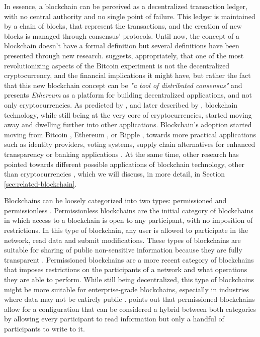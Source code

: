 In essence, a blockchain can be perceived as a decentralized transaction ledger, with no central authority and no single point of failure. This ledger is maintained by a chain of blocks, that represent the transactions, and the creation of new blocks is managed through consensus' protocols. Until now, the concept of a blockchain doesn't have a formal definition but several definitions have been presented through new research. \citeauthor{buterin_next-generation_2013} \cite{buterin_next-generation_2013} suggests, appropriately, that one of the most revolutionizing aspects of the Bitcoin experiment is not the decentralized cryptocurrency, and the financial implications it might have, but rather the fact that this new blockchain concept can be \textit{"a tool of distributed consensus"} \cite{buterin_next-generation_2013} and presents \textit{Ethereum} as a platform for building decentralized applications, and not only cryptocurrencies. As predicted by \citeauthor{buterin_next-generation_2013} \cite{buterin_next-generation_2013}, and later described by \citeauthor{pilkington_blockchain_2016} \cite{pilkington_blockchain_2016}, blockchain technology, while still being at the very core of cryptocurrencies, started moving away and dwelling further into other applications. Blockchain's adoption started moving from Bitcoin \cite{nakamoto_bitcoin:_2008}, Ethereum \cite{buterin_next-generation_2013}, or Ripple \cite{schwartz_ripple_2014}, towards more practical applications such as identity providers, voting systems, supply chain alternatives for enhanced transparency or banking applications \cite{pilkington_blockchain_2016}. At the same time, other research has pointed towards different possible applications of blockchain technology, other than cryptocurrencies \cite{crosby_blockchain_2016, underwood_blockchain_2016, yermack_corporate_2017, xu_blockchain_2016}, which we will discuss, in more detail, in Section \ref{sec:related-blockchain}.

Blockchains can be loosely categorized into two types: permissioned and permissionless \cite{pilkington_blockchain_2016, yaga_blockchain_2018}. Permissionless blockchains are the initial category of blockchains in which access to a blockchain is open to any participant, with no imposition of restrictions. In this type of blockchain, any user is allowed to participate in the network, read data and submit modifications. These types of blockchains are suitable for sharing of public non-sensitive information because they are fully transparent \cite{yaga_blockchain_2018}. Permissioned blockchains are a more recent category of blockchains that imposes restrictions on the participants of a network and what operations they are able to perform. While still being decentralized, this type of blockchains might be more suitable for enterprise-grade blockchains, especially in industries where data may not be entirely public \cite{yaga_blockchain_2018}. \citeauthor{pilkington_blockchain_2016} \cite{pilkington_blockchain_2016} points out that permissioned blockchains allow for a configuration that can be considered a hybrid between both categories by allowing every participant to read information but only a handful of participants to write to it.


